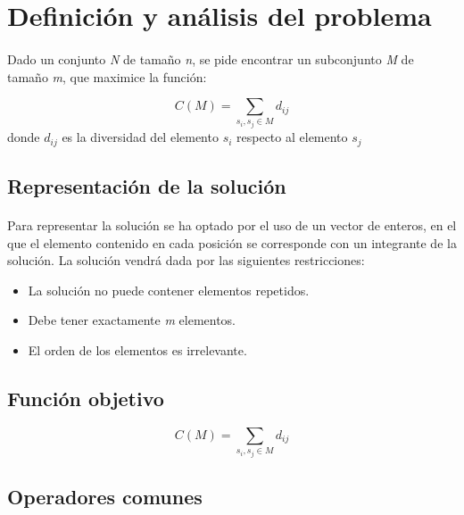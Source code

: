 \documentclass{article}
\begin{document}
	\tableofcontents
	
	\newpage
	
	\section{Definición y análisis del problema}
	
	\paragraph{}Dado un conjunto \emph{N} de tamaño \emph{n}, se pide encontrar un subconjunto \emph{M} de tamaño \emph{m}, que maximice
	la función: 
	
	\[ C(M)=\sum_{s_i , s_j \in M} d_{ij}\]
	donde  $d_{ij}$ es la diversidad del elemento $s_i$ respecto al elemento $s_j$
	
	\subsection{Representación de la solución}
	
	\paragraph{} Para representar la solución se ha optado por el uso de un vector de enteros, en el que el elemento contenido en cada posición se corresponde con un integrante de la solución. La solución vendrá dada por las siguientes restricciones:
	\begin{itemize}
		
		\item La solución no puede contener elementos repetidos.
		
		\item Debe tener exactamente \emph{m} elementos.
		
		\item El orden de los elementos es irrelevante.
		
	\end{itemize}
	
	
	\subsection{Función objetivo}
	
	\[ C(M)=\sum_{s_i , s_j \in M} d_{ij}\]
	
	\subsection{Operadores comunes}
	
\end{document}
